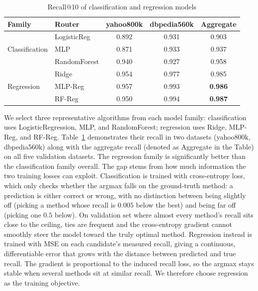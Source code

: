 \begin{table}[!htbp]
\centering
\captionsetup{justification=centering, singlelinecheck=false}
\caption{Recall@10 of classification and regression models
}
\label{tab:cls-vs-reg}
\small
\begin{tabular}{@{}llccc@{}}
\toprule
Family & Router & yahoo800k & dbpedia560k & Aggregate \\
\midrule
\multirow{3}{*}{Classification}
 & LogisticReg  & 0.892 & 0.931 & 0.903 \\
 & MLP          & 0.871 & 0.933 & 0.937 \\
 & RandomForest & 0.940 & 0.927 & 0.958 \\
\midrule
\multirow{3}{*}{Regression}
 & Ridge        & 0.954 & 0.977 & 0.985 \\
 & MLP-Reg      & 0.957 & 0.993 & \textbf{0.986} \\
 & RF-Reg       & 0.950 & 0.994 & \textbf{0.987} \\
\bottomrule
\end{tabular}
\end{table}

We select three representative algorithms from each model family: classification uses LogisticRegression, MLP, and RandomForest; regression uses Ridge, MLP-Reg, and RF-Reg.
Table~\ref{tab:cls-vs-reg} demonstrates their recall in two datasets (yahoo800k, dbpedia560k) along with the aggregate recall (denoted as Aggregate in the Table) on all five validation datasets.
The regression family is significantly better than the classification family overall. %
The gap stems from how much information the two training losses can exploit. Classification is trained with cross-entropy loss, which only checks whether the argmax falls on the ground-truth method: a prediction is either correct or wrong, with no distinction between being slightly off (picking a method whose recall is $0.005$ below the best) and being far off (picking one $0.5$ below). On validation set where almost every method's recall sits close to the ceiling, ties are frequent and the cross-entropy gradient cannot smoothly steer the model toward the truly optimal method. Regression instead is trained with MSE on each candidate's measured recall, giving a continuous, differentiable error that grows with the distance between predicted and true recall. The gradient is proportional to the induced recall loss, so the argmax stays stable when several methods sit at similar recall.
We therefore choose regression as the training objective.

